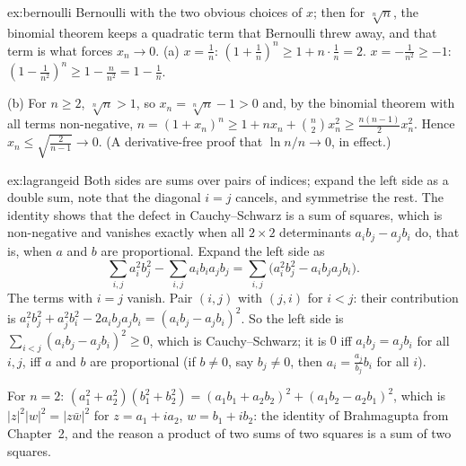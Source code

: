 \begin{solution}{ex:bernoulli}
\idea Bernoulli with the two obvious choices of $x$; then for $\sqrt[n]n$, the binomial theorem keeps a quadratic term that Bernoulli threw away, and that term is what forces $x_n\to0$.
\writeup (a) $x=\frac1n$: $(1+\frac1n)^n\ge1+n\cdot\frac1n=2$. $x=-\frac1{n^2}\ge-1$: $(1-\frac1{n^2})^n\ge1-\frac n{n^2}=1-\frac1n$.

(b) For $n\ge2$, $\sqrt[n]n>1$, so $x_n=\sqrt[n]n-1>0$ and, by the binomial theorem with all terms non-negative, $n=(1+x_n)^n\ge1+nx_n+\binom n2x_n^2\ge\frac{n(n-1)}2x_n^2$. Hence $x_n\le\sqrt{\frac2{n-1}}\to0$. (A derivative-free proof that $\ln n/n\to0$, in effect.)
\end{solution}

\begin{solution}{ex:lagrangeid}
\idea Both sides are sums over pairs of indices; expand the left side as a double sum, note that the diagonal $i=j$ cancels, and symmetrise the rest. The identity shows that the defect in Cauchy--Schwarz is a sum of squares, which is non-negative and vanishes exactly when all $2\times2$ determinants $a_ib_j-a_jb_i$ do, that is, when $a$ and $b$ are proportional.
\writeup Expand the left side as
\[
\sum_{i,j}a_i^2b_j^2-\sum_{i,j}a_ib_ia_jb_j
=\sum_{i,j}\bigl(a_i^2b_j^2-a_ib_ja_jb_i\bigr).
\] The terms with $i=j$ vanish. Pair $(i,j)$ with $(j,i)$ for $i<j$: their contribution is $a_i^2b_j^2+a_j^2b_i^2-2a_ib_ja_jb_i=(a_ib_j-a_jb_i)^2$. So the left side is $\sum_{i<j}(a_ib_j-a_jb_i)^2\ge0$, which is Cauchy--Schwarz; it is $0$ iff $a_ib_j=a_jb_i$ for all $i,j$, iff $a$ and $b$ are proportional (if $b\ne0$, say $b_j\ne0$, then $a_i=\frac{a_j}{b_j}b_i$ for all $i$).

For $n=2$: $(a_1^2+a_2^2)(b_1^2+b_2^2)=(a_1b_1+a_2b_2)^2+(a_1b_2-a_2b_1)^2$, which is $|z|^2|w|^2=|z\bar w|^2$ for $z=a_1+ia_2$, $w=b_1+ib_2$: the identity of Brahmagupta from Chapter~2, and the reason a product of two sums of two squares is a sum of two squares.
\end{solution}

